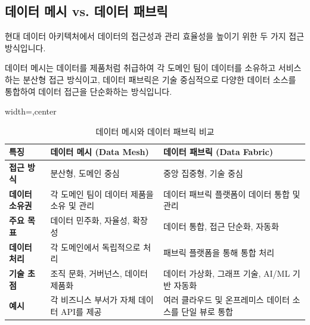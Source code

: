 \documentclass[11pt,a4paper]{article}
\theoremstyle{definition}
\begin{document}
\subsection{데이터 메시 vs. 데이터 패브릭}
현대 데이터 아키텍처에서 데이터의 접근성과 관리 효율성을 높이기 위한 두 가지 접근 방식입니다.

\begin{summarybox}[title=핵심 요약: 데이터 접근성 향상]
데이터 메시는 데이터를 제품처럼 취급하여 각 도메인 팀이 데이터를 소유하고 서비스하는 분산형 접근 방식이고, 데이터 패브릭은 기술 중심적으로 다양한 데이터 소스를 통합하여 데이터 접근을 단순화하는 방식입니다.
\end{summarybox}

\begin{table}[h!]
\centering
\caption{데이터 메시와 데이터 패브릭 비교}
\label{tab:data_mesh_fabric_comparison}
\begin{adjustbox}{width=\textwidth,center}
\begin{tabular}{p{}p{}p{}}
\toprule
\textbf{특징} & \textbf{데이터 메시 (Data Mesh)} & \textbf{데이터 패브릭 (Data Fabric)} \\
\midrule
\textbf{접근 방식} & 분산형, 도메인 중심 & 중앙 집중형, 기술 중심 \\
\textbf{데이터 소유권} & 각 도메인 팀이 데이터 제품을 소유 및 관리 & 데이터 패브릭 플랫폼이 데이터 통합 및 관리 \\
\textbf{주요 목표} & 데이터 민주화, 자율성, 확장성 & 데이터 통합, 접근 단순화, 자동화 \\
\textbf{데이터 처리} & 각 도메인에서 독립적으로 처리 & 패브릭 플랫폼을 통해 통합 처리 \\
\textbf{기술 초점} & 조직 문화, 거버넌스, 데이터 제품화 & 데이터 가상화, 그래프 기술, AI/ML 기반 자동화 \\
\textbf{예시} & 각 비즈니스 부서가 자체 데이터 API를 제공 & 여러 클라우드 및 온프레미스 데이터 소스를 단일 뷰로 통합 \\
\bottomrule
\end{tabular}
\end{adjustbox}
\end{table}
\end{document}
